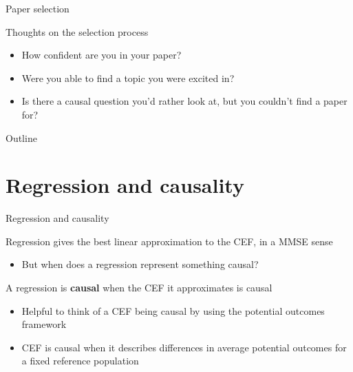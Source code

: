 \documentclass[compress, 8pt]{beamer}
\begin{document}
\begin{frame}{Paper selection}

Thoughts on the selection process
\begin{itemize}
    \item How confident are you in your paper? 
    \item Were you able to find a topic you were excited in?
    \item Is there a causal question you'd rather look at, but you couldn't find a paper for?
\end{itemize}

\end{frame}




\miniframesoff
\begin{frame}{Outline}
    \tableofcontents
\end{frame}
\miniframeson



\section[Causality]{Regression and causality}
\miniframesoff
\begin{frame}
    \tableofcontents[currentsection]
\end{frame}
\miniframeson


\begin{frame}{Regression and causality}

Regression gives the best linear approximation to the CEF, in a MMSE sense
\begin{itemize}
    \item But when does a regression represent something causal?
\end{itemize}

\vspace{2ex}
A regression is \textbf{causal} when the CEF it approximates is causal
\begin{itemize}
    \item Helpful to think of a CEF being causal by using the potential outcomes framework
    \item CEF is causal when it describes differences in average potential outcomes for a fixed reference population
\end{itemize}

\end{frame}
\end{document}
